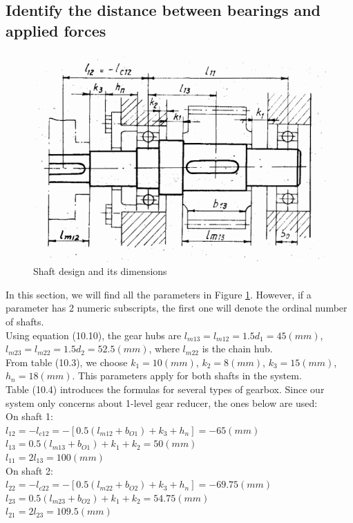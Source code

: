 \subsection{Identify the distance between bearings and applied forces}

\begin{figure}[ht]
	\centering
	\includegraphics[width=150mm]{shaft1.png}
	\caption{Shaft design and its dimensions}
	\label{shaft}
\end{figure}

In this section, we will find all the parameters in Figure \ref{shaft}. However, if a parameter has 2 numeric subscripts, the first one will denote the ordinal number of shafts.\\
Using equation (10.10), the gear hubs are $ l_{m13} = l_{m12} = 1.5d_1 =  45\unit{(mm)} $, $ l_{m23} = l_{m22} = 1.5d_2 = 52.5\unit{(mm)} $, where $ l_{m22} $ is the chain hub.\\
From table (10.3), we choose $ k_1=10\unit{(mm)}$, $ k_2=8\unit{(mm)} $, $ k_3=15\unit{(mm)} $, $ h_n=18\unit{(mm)} $. This parameters apply for both shafts in the system.\\
Table (10.4) introduces the formulas for several types of gearbox. Since our system only concerns about 1-level gear reducer, the ones below are used:\\
On shaft 1:\\
$ l_{12} = -l_{c12} = -\left[ 0.5(l_{m12}+b_{O1})+k_3+h_n  \right] = -65 \unit{(mm)} $\\
$ l_{13} = 0.5(l_{m13}+b_{O1})+k_1+k_2 = 50 \unit{(mm)} $\\
$ l_{11} = 2l_{13} = 100 \unit{(mm)}$\\
On shaft 2:\\
$ l_{22} = -l_{c22} = -\left[ 0.5(l_{m22}+b_{O2})+k_3+h_n \right] = -69.75 \unit{(mm)} $\\
$ l_{23} = 0.5(l_{m23}+b_{O2})+k_1+k_2 = 54.75 \unit{(mm)} $\\
$ l_{21} = 2l_{23} = 109.5 \unit{(mm)}$


